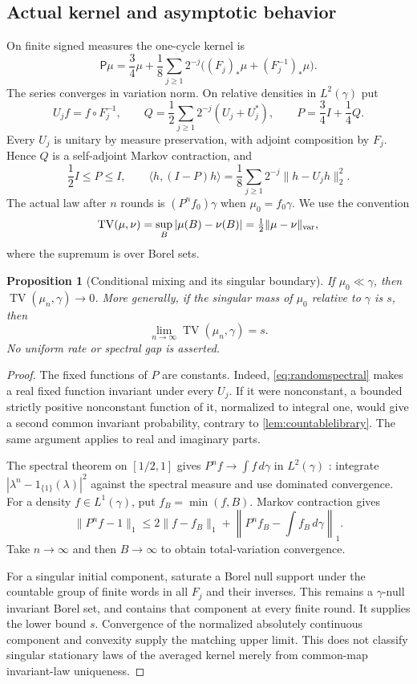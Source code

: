 \documentclass[11pt]{article}
\numberwithin{equation}{section}
\newtheorem{proposition}[proposition]{Proposition}
\theoremstyle{definition}
\begin{document}
\subsection{Actual kernel and asymptotic behavior}
On finite signed measures the one-cycle kernel is
\begin{equation}\label{eq:randomkernel}
 \mathsf P\mu=\frac34\mu+\frac18\sum_{j\ge1}2^{-j}
      \bigl((F_j)_*\mu+(F_j^{-1})_*\mu\bigr).
\end{equation}
The series converges in variation norm. On relative densities in $L^2(\gamma)$ put
\[
 U_jf=f\circ F_j^{-1},\qquad
 Q=\frac12\sum_{j\ge1}2^{-j}(U_j+U_j^*),\qquad
 P=\frac34I+\frac14Q.
\]
Every $U_j$ is unitary by measure preservation, with adjoint composition by $F_j$. Hence $Q$ is a self-adjoint Markov contraction, and
\begin{equation}\label{eq:randomspectral}
 \frac12I\le P\le I,\qquad
 \langle h,(I-P)h\rangle
   =\frac18\sum_{j\ge1}2^{-j}\|h-U_jh\|_2^2.
\end{equation}
The actual law after $n$ rounds is $(P^nf_0)\gamma$ when $\mu_0=f_0\gamma$. We use the convention
\[
 \operatorname{TV}(\mu,\nu)=\sup_B|\mu(B)-\nu(B)|=\tfrac12\|\mu-\nu\|_{\rm var},
\]
where the supremum is over Borel sets.

\begin{proposition}[Conditional mixing and its singular boundary]\label{prop:mixing}
If $\mu_0\ll\gamma$, then $\operatorname{TV}(\mu_n,\gamma)\to0$. More generally, if the singular mass of $\mu_0$ relative to $\gamma$ is $s$, then
\[
 \lim_{n\to\infty}\operatorname{TV}(\mu_n,\gamma)=s.
\]
No uniform rate or spectral gap is asserted.
\end{proposition}
\begin{proof}
The fixed functions of $P$ are constants. Indeed, \eqref{eq:randomspectral} makes a real fixed function invariant under every $U_j$. If it were nonconstant, a bounded strictly positive nonconstant function of it, normalized to integral one, would give a second common invariant probability, contrary to \cref{lem:countablelibrary}. The same argument applies to real and imaginary parts.

The spectral theorem on $[1/2,1]$ gives $P^nf\to\int f\,d\gamma$ in $L^2(\gamma)$ \citep{Teschl2009}: integrate $|\lambda^n-1_{\{1\}}(\lambda)|^2$ against the spectral measure and use dominated convergence. For a density $f\in L^1(\gamma)$, put $f_B=\min(f,B)$. Markov contraction gives
\[
 \|P^nf-1\|_1\le2\|f-f_B\|_1+
 \left\|P^nf_B-\int f_B\,d\gamma\right\|_1.
\]
Take $n\to\infty$ and then $B\to\infty$ to obtain total-variation convergence.

For a singular initial component, saturate a Borel null support under the countable group of finite words in all $F_j$ and their inverses. This remains a $\gamma$-null invariant Borel set, and contains that component at every finite round. It supplies the lower bound $s$. Convergence of the normalized absolutely continuous component and convexity supply the matching upper limit. This does not classify singular stationary laws of the averaged kernel merely from common-map invariant-law uniqueness.
\end{proof}
\end{document}
